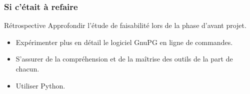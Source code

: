   \begin{frame}
  \frametitle{\color{white}Si c'était à refaire}
    \begin{block}{Rétrospective}
    Approfondir l'étude de faisabilité lors de la phase d'avant projet.
      \begin{itemize}
        \item Expérimenter plus en détail le logiciel GnuPG en ligne de commandes.
        \item S'assurer de la compréhension et de la maîtrise des outils de la part de chacun.
        \item Utiliser Python.
      \end{itemize}
    \end{block}


  \end{frame}
